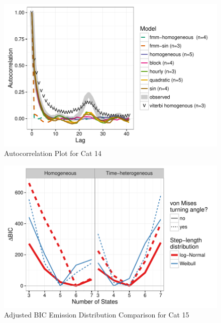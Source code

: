 \documentclass{article}\usepackage[]{graphicx}\usepackage{xcolor}
\makeatletter
\def\maxwidth{ %
  \ifdim\Gin@nat@width>\linewidth
    \linewidth
  \else
    \Gin@nat@width
  \fi
}
\newenvironment{knitrout}{}{} %
\makeatother
\begin{document}
\begin{knitrout}
\color{fgcolor}\begin{figure}
\includegraphics[width=\maxwidth]{figure/acf_plot14-1} \caption[Autocorrelation Plot for Cat 14]{Autocorrelation Plot for Cat 14}\label{fig:acf_plot14}
\end{figure}


\end{knitrout}

\clearpage

\begin{knitrout}
\color{fgcolor}\begin{figure}
\includegraphics[width=\maxwidth]{figure/BICred_plot15-1} \caption[Adjusted BIC Emission Distribution Comparison for Cat 15]{Adjusted BIC Emission Distribution Comparison for Cat 15}\label{fig:BICred_plot15}
\end{figure}


\end{knitrout}
\end{document}
